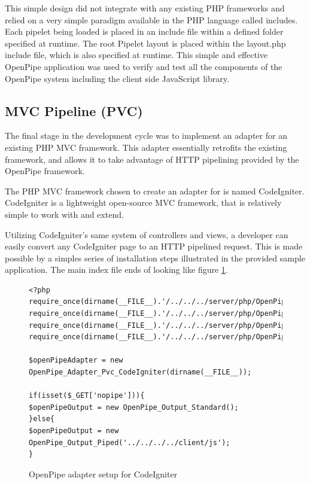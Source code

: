 \documentclass[12pt]{report}
\begin{document}
This simple design did not integrate with any existing PHP frameworks and relied on a very simple paradigm available in the PHP language called includes. Each pipelet being loaded is placed in an include file within a defined folder specified at runtime. The root Pipelet layout is placed within the layout.php include file,	 which is also specified at runtime. This simple and effective OpenPipe application was used to verify and test all the components of the OpenPipe system including the client side JavaScript library. 


\subsection{MVC Pipeline (PVC)}

The final stage in the development cycle was to implement an adapter for an existing PHP MVC framework. This adapter essentially retrofits the existing framework, and allows it to take advantage of HTTP pipelining provided by the OpenPipe framework. 

The PHP MVC framework chosen to create an adapter for is named CodeIgniter. CodeIgniter is a lightweight open-source MVC framework, that is relatively simple to work with and extend. 

Utilizing CodeIgniter’s same system of controllers and views, a developer can easily convert any CodeIgniter page to an HTTP pipelined request. This is made possible by a simples series of installation steps illustrated in the provided sample application. The main index file ends of looking like figure \ref{fig:codeIgniterPvcCode}.

\begin{figure}[H]
\caption{OpenPipe adapter setup for CodeIgniter}
\label{fig:codeIgniterPvcCode}
\begin{lstlisting}
<?php
require_once(dirname(__FILE__).'/../../../server/php/OpenPipe/Adapter/Pvc/CodeIgniter.php');
require_once(dirname(__FILE__).'/../../../server/php/OpenPipe/Output/Piped.php');
require_once(dirname(__FILE__).'/../../../server/php/OpenPipe/Output/Standard.php');
require_once(dirname(__FILE__).'/../../../server/php/OpenPipe/Runner.php');

$openPipeAdapter = new OpenPipe_Adapter_Pvc_CodeIgniter(dirname(__FILE__));

if(isset($_GET['nopipe'])){
$openPipeOutput = new OpenPipe_Output_Standard();	
}else{
$openPipeOutput = new OpenPipe_Output_Piped('../../../../client/js');	
}
\end{lstlisting}
\end{figure}
\end{document}
